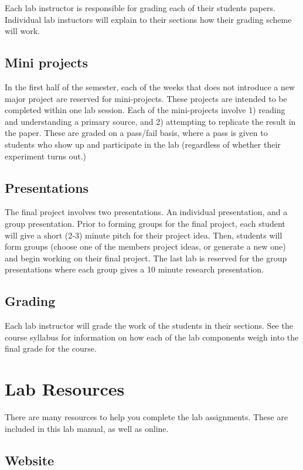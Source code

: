 Each lab instructor is responsible for grading each of their students papers. Individual lab instuctors will explain to their sections how their grading scheme will work.
 
\subsection{Mini projects} 
In the first half of the semester, each of the weeks that does not introduce a new major project are reserved for mini-projects. These projects are intended to be completed within one lab session. Each of the mini-projects involve 1) reading and understanding a primary source, and 2) attempting to replicate the result in the paper. These are graded on a pass/fail basis, where a pass is given to students who show up and participate in the lab (regardless of whether their experiment turns out.)

\subsection{Presentations} 
The final project involves two presentations. An individual presentation, and a group presentation. Prior to forming groups for the final project, each student will give a short (2-3) minute pitch for their project idea. Then, students will form groups (choose one of the members project ideas, or generate a new one) and begin working on their final project. The last lab is reserved for the group presentations where each group gives a 10 minute research presentation. 

\subsection{Grading}

Each lab instructor will grade the work of the students in their sections. See the course syllabus for information on how each of the lab components weigh into the final grade for the course.

\section{Lab Resources}

There are many resources to help you complete the lab assignments. These are included in this lab manual, as well as online.

\subsection{Website}

